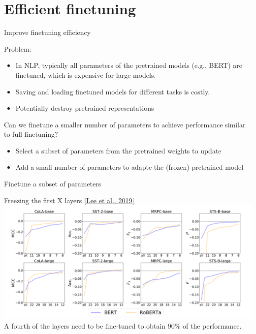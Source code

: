\documentclass[usenames,dvipsnames,notes,11pt,aspectratio=169,hyperref={colorlinks=true, linkcolor=blue}]{beamer}
\begin{document}
\section{Efficient finetuning}

\begin{frame}
    {Improve finetuning efficiency}

    Problem:\\
    \begin{itemize}
        \item In NLP, typically all parameters of the pretrained models (e.g., BERT) are finetuned, which is expensive for large models.
        \item Saving and loading finetuned models for different tasks is costly.
        \item Potentially destroy pretrained representations
    \end{itemize}
    \pause

    Can we finetune a smaller number of parameters to achieve performance similar to full finetuning?\\\pause
    \begin{itemize}
        \item Select a subset of parameters from the pretrained weights to update 
        \item Add a small number of parameters to adapte the (frozen) pretrained model
    \end{itemize}
\end{frame}

\begin{frame}
    {Finetune a subset of parameters}

    Freezing the first X layers \href{https://arxiv.org/pdf/1911.03090.pdf}{[Lee et al., 2019]} \\[1ex]

    \includegraphics[width=\textwidth]{figures/layer-freezing}\\

    A fourth of the layers need to be fine-tuned to obtain 90\% of the performance.
\end{frame}
\end{document}
